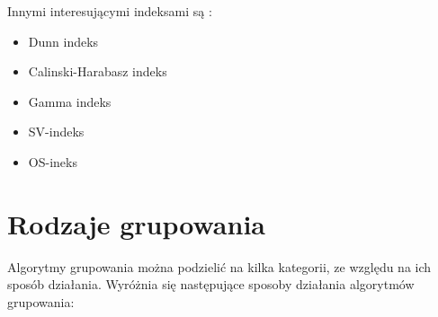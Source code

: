 \documentclass{article}
\begin{document}
Innymi interesującymi indeksami są \cite{validity_indices}:

\begin{itemize}
	\item Dunn indeks
	\item Calinski-Harabasz indeks
	\item Gamma indeks
	\item SV-indeks
	\item OS-ineks 
\end{itemize}

\newpage
\section{Rodzaje grupowania}

Algorytmy grupowania można podzielić na kilka kategorii, ze względu na ich sposób działania. Wyróżnia się następujące sposoby działania algorytmów grupowania:
\end{document}

